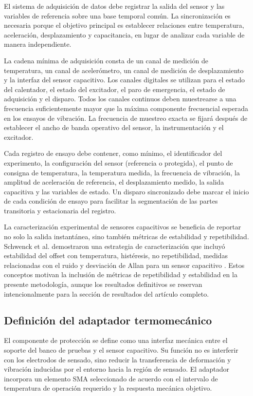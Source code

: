 \documentclass[conference]{IEEEtran}
\begin{document}
El sistema de adquisición de datos debe registrar la salida del sensor y las variables de referencia sobre una base temporal común. La sincronización es necesaria porque el objetivo principal es establecer relaciones entre temperatura, aceleración, desplazamiento y capacitancia, en lugar de analizar cada variable de manera independiente.

La cadena mínima de adquisición consta de un canal de medición de temperatura, un canal de acelerómetro, un canal de medición de desplazamiento y la interfaz del sensor capacitivo. Los canales digitales se utilizan para el estado del calentador, el estado del excitador, el paro de emergencia, el estado de adquisición y el disparo. Todos los canales continuos deben muestrearse a una frecuencia suficientemente mayor que la máxima componente frecuencial esperada en los ensayos de vibración. La frecuencia de muestreo exacta se fijará después de establecer el ancho de banda operativo del sensor, la instrumentación y el excitador.

Cada registro de ensayo debe contener, como mínimo, el identificador del experimento, la configuración del sensor (referencia o protegida), el punto de consigna de temperatura, la temperatura medida, la frecuencia de vibración, la amplitud de aceleración de referencia, el desplazamiento medido, la salida capacitiva y las variables de estado. Un disparo sincronizado debe marcar el inicio de cada condición de ensayo para facilitar la segmentación de las partes transitoria y estacionaria del registro.

La caracterización experimental de sensores capacitivos se beneficia de reportar no solo la salida instantánea, sino también métricas de estabilidad y repetibilidad. Schwenck et al. demostraron una estrategia de caracterización que incluyó estabilidad del offset con temperatura, histéresis, no repetibilidad, medidas relacionadas con el ruido y desviación de Allan para un sensor capacitivo \cite{Schwenck2021}. Estos conceptos motivan la inclusión de métricas de repetibilidad y estabilidad en la presente metodología, aunque los resultados definitivos se reservan intencionalmente para la sección de resultados del artículo completo.

\subsection{Definición del adaptador termomecánico}

El componente de protección se define como una interfaz mecánica entre el soporte del banco de pruebas y el sensor capacitivo. Su función no es interferir con los electrodos de sensado, sino reducir la transferencia de deformación y vibración inducidas por el entorno hacia la región de sensado. El adaptador incorpora un elemento SMA seleccionado de acuerdo con el intervalo de temperatura de operación requerido y la respuesta mecánica objetivo.
\end{document}
